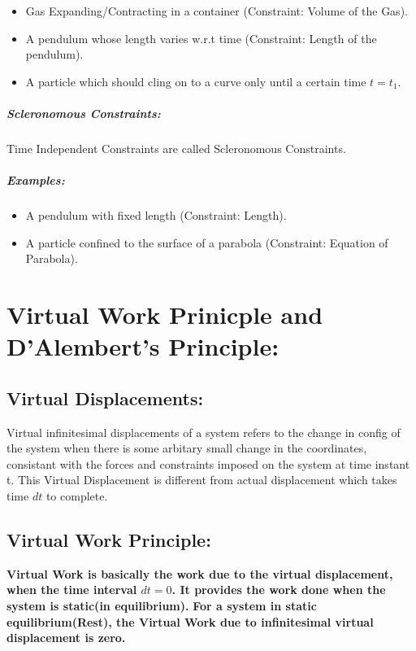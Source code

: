 \documentclass[a4paper]{article}
\begin{document}
			\begin{itemize}
				\item Gas Expanding/Contracting in a container (Constraint: Volume of the Gas).
				\item A pendulum whose length varies w.r.t time (Constraint: Length of the pendulum).
				\item A particle which should cling on to a curve only until a certain time $t=t_1$.
			\end{itemize}

		\subparagraph*{Scleronomous Constraints: }
			Time Independent Constraints are called Scleronomous Constraints.

			\subparagraph*{Examples: }

			\begin{itemize}
				\item A pendulum with fixed length (Constraint: Length).
				\item A particle confined to the surface of a parabola (Constraint: Equation of Parabola).
			\end{itemize}

	\section*{Virtual Work Prinicple and D'Alembert's Principle: }
		
		\subsection*{Virtual Displacements: }
		Virtual infinitesimal displacements of a system refers to the change in config of the system when there is some arbitary small change in the coordinates, consistant with the forces and constraints imposed on the system at time instant t. This Virtual Displacement is different from actual displacement which takes time $dt$ to complete.
		
		\subsection*{Virtual Work Principle: }
			\textbf{Virtual Work is basically the work due to the virtual displacement, when the time interval $dt=0$. It provides the work done when the system is static(in equilibrium).}
			\textbf{For a system in static equilibrium(Rest), the Virtual Work due to infinitesimal virtual displacement is zero.}
\end{document}
